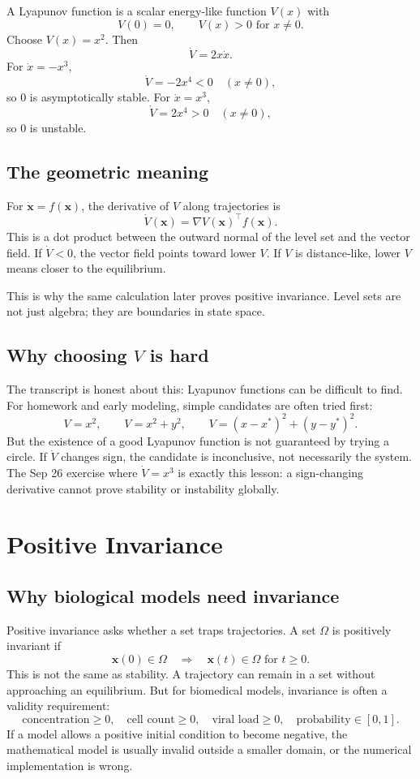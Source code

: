 \documentclass[a4paper]{article}
\newcommand{\vect}[1]{\boldsymbol{#1}}
\begin{document}
A Lyapunov function is a scalar energy-like function \(V(x)\) with
\[
  V(0)=0,\qquad V(x)>0 \text{ for } x\ne 0.
\]
Choose \(V(x)=x^2\). Then
\[
  \dot V=2x\dot x.
\]
For \(\dot x=-x^3\),
\[
  \dot V=-2x^4<0\quad (x\ne 0),
\]
so \(0\) is asymptotically stable. For \(\dot x=x^3\),
\[
  \dot V=2x^4>0\quad (x\ne 0),
\]
so \(0\) is unstable.

\subsection{The geometric meaning}

For \(\dot{\vect x}=f(\vect x)\), the derivative of \(V\) along trajectories is
\[
  \dot V(\vect x)
  =
  \nabla V(\vect x)^\top f(\vect x).
\]
This is a dot product between the outward normal of the level set and the vector field. If \(\dot V<0\), the vector field points toward lower \(V\). If \(V\) is distance-like, lower \(V\) means closer to the equilibrium.

This is why the same calculation later proves positive invariance. Level sets are not just algebra; they are boundaries in state space.

\subsection{Why choosing \(V\) is hard}

The transcript is honest about this: Lyapunov functions can be difficult to find. For homework and early modeling, simple candidates are often tried first:
\[
  V=x^2,\qquad
  V=x^2+y^2,\qquad
  V=(x-x^\ast)^2+(y-y^\ast)^2.
\]
But the existence of a good Lyapunov function is not guaranteed by trying a circle. If \(\dot V\) changes sign, the candidate is inconclusive, not necessarily the system. The Sep 26 exercise where \(\dot V=x^3\) is exactly this lesson: a sign-changing derivative cannot prove stability or instability globally.

\section{Positive Invariance}

\subsection{Why biological models need invariance}

Positive invariance asks whether a set traps trajectories. A set \(\Omega\) is positively invariant if
\[
  \vect x(0)\in\Omega
  \quad\Longrightarrow\quad
  \vect x(t)\in\Omega \text{ for } t\ge 0.
\]
This is not the same as stability. A trajectory can remain in a set without approaching an equilibrium. But for biomedical models, invariance is often a validity requirement:
\[
  \text{concentration}\ge 0,\quad
  \text{cell count}\ge 0,\quad
  \text{viral load}\ge 0,\quad
  \text{probability}\in[0,1].
\]
If a model allows a positive initial condition to become negative, the mathematical model is usually invalid outside a smaller domain, or the numerical implementation is wrong.
\end{document}
